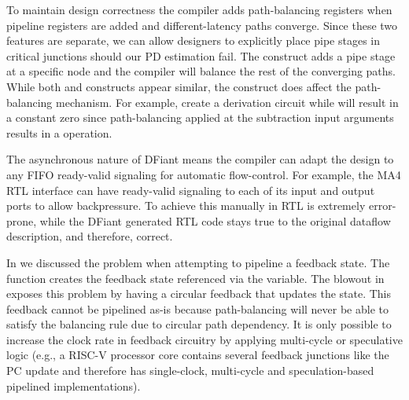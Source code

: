 To maintain design correctness the compiler adds path-balancing registers when pipeline registers are added and different-latency paths converge. Since these two features are separate, we can allow designers to explicitly place pipe stages in critical junctions should our PD estimation fail. The  construct adds a pipe stage at a specific node and the compiler will balance the rest of the converging paths. While both  and  constructs appear similar, the  construct does affect the path-balancing mechanism. For example,  create a derivation circuit while  will result in a constant zero since path-balancing applied at the subtraction input arguments results in a  operation.

The asynchronous nature of DFiant means the compiler can adapt the design to any FIFO ready-valid signaling for automatic flow-control. For example, the MA4 RTL interface can have ready-valid signaling to each of its input and output ports to allow backpressure. To achieve this manually in RTL is extremely error-prone, while the DFiant generated RTL code stays true to the original dataflow description, and therefore, correct.
 
In  we discussed the problem when attempting to pipeline a feedback state. The  function creates the feedback state referenced via the  variable. The  blowout in  exposes this problem by having a circular feedback that updates the  state. This feedback cannot be pipelined as-is because path-balancing will never be able to satisfy the balancing rule due to circular path dependency. It is only possible to increase the clock rate in feedback circuitry by applying multi-cycle or speculative logic (e.g., a RISC-V processor core contains several feedback junctions like the PC update and therefore has single-clock, multi-cycle and speculation-based pipelined implementations). 




